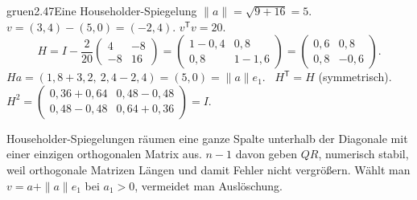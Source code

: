\begin{loesungkarte}{gruen}{2.47}{Eine Householder-Spiegelung}
$\|a\| = \sqrt{9 + 16} = 5$. $v = (3, 4) - (5, 0) = (-2, 4)$. $v^{\mathsf T}v = 20$.
\[ H = I - \frac2{20}\begin{pmatrix}4 & -8\\ -8 & 16\end{pmatrix} = \begin{pmatrix}1 - 0{,}4 & 0{,}8\\ 0{,}8 & 1 - 1{,}6\end{pmatrix} = \begin{pmatrix}0{,}6 & 0{,}8\\ 0{,}8 & -0{,}6\end{pmatrix}. \]
$Ha = (1{,}8 + 3{,}2,\ 2{,}4 - 2{,}4) = (5, 0) = \|a\|e_1$. \checkmark\ $H^{\mathsf T} = H$ (symmetrisch). \checkmark\ $H^{2} = \begin{pmatrix}0{,}36 + 0{,}64 & 0{,}48 - 0{,}48\\ 0{,}48 - 0{,}48 & 0{,}64 + 0{,}36\end{pmatrix} = I$. \checkmark
{}
\begin{mitnehmen}\kastentext
Householder-Spiegelungen räumen eine ganze Spalte unterhalb der Diagonale mit einer einzigen orthogonalen Matrix aus. $n - 1$ davon geben $QR$, numerisch stabil, weil orthogonale Matrizen Längen und damit Fehler nicht vergrößern. Wählt man $v = a + \|a\|e_1$ bei $a_1 > 0$, vermeidet man Auslöschung.
\end{mitnehmen}
\end{loesungkarte}

